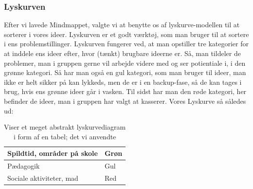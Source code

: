 \documentclass[12pt, a4paper]{article}
\begin{document}
\subsubsection{Lyskurven}
    Efter vi lavede Mindmappet, valgte vi at benytte os af lyskurve-modellen til at sorterer i vores ideer. Lyskurven er et godt værktøj, som man bruger til at sortere i ens problemstillinger.
    Lyskurven fungerer ved, at man opstiller tre kategorier for at inddele ens ideer efter, hvor (tænkt) brugbare ideerne er. Så, man tildeler de problemer, man i gruppen gerne vil arbejde videre med og ser potientiale i, i den grønne kategori.
    Så har man også en gul kategori, som man bruger til ideer, man ikke er helt sikker på kan lykkeds, men de er i en backup-fase, så de kan tages i brug, hvis ens grønne ideer går i vasken.
    Til sidst har man den røde kategori, her befinder de ideer, man i gruppen har valgt at kasserer. Vores Lyskurve så således ud: 

\begin{table}[H]
    \centering
    \begin{tabular}{ll}
    \hline
    Spildtid,  områder på skole& Grøn \\
    \hline
    Pædagogik & Gul \\
    \hline
    Sociale aktiviteter, mad & Red
    \end{tabular}
    \caption{Viser et meget abstrakt lyskurvediagram i form af en tabel; det vi anvendte \label{fig:lyskurven}}
    \end{table}
\end{document}
